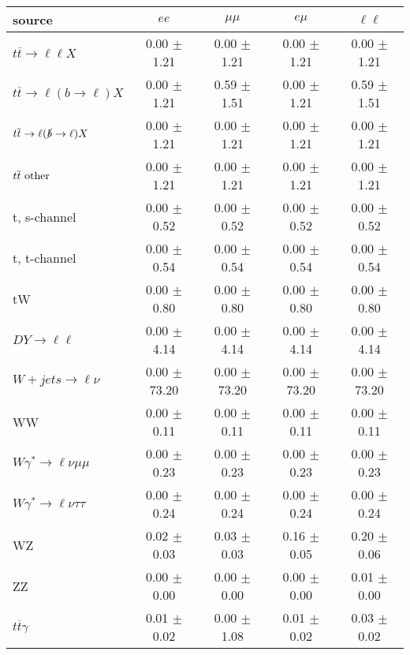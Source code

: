 \begin{tabular}{l|cccc} \hline\hline
source & $ee$ & $\mu\mu$ & $e\mu$ & $\ell\ell $ \\
\hline
$t\overline{t} \rightarrow \ell \ell X$ &  0.00 $\pm$  1.21 &  0.00 $\pm$  1.21 &  0.00 $\pm$  1.21 &  0.00 $\pm$  1.21 \\
$t\overline{t} \rightarrow \ell (b \rightarrow \ell) X$ &  0.00 $\pm$  1.21 &  0.59 $\pm$  1.51 &  0.00 $\pm$  1.21 &  0.59 $\pm$  1.51 \\
$t\overline{t} \rightarrow \ell (\slashed b \rightarrow \ell) X$ &  0.00 $\pm$  1.21 &  0.00 $\pm$  1.21 &  0.00 $\pm$  1.21 &  0.00 $\pm$  1.21 \\
        $t\overline{t}\ \rm{other}$ &  0.00 $\pm$  1.21 &  0.00 $\pm$  1.21 &  0.00 $\pm$  1.21 &  0.00 $\pm$  1.21 \\
\hline
                       t, s-channel &  0.00 $\pm$  0.52 &  0.00 $\pm$  0.52 &  0.00 $\pm$  0.52 &  0.00 $\pm$  0.52 \\
                       t, t-channel &  0.00 $\pm$  0.54 &  0.00 $\pm$  0.54 &  0.00 $\pm$  0.54 &  0.00 $\pm$  0.54 \\
                                 tW &  0.00 $\pm$  0.80 &  0.00 $\pm$  0.80 &  0.00 $\pm$  0.80 &  0.00 $\pm$  0.80 \\
\hline
         $DY \rightarrow \ell \ell$ &  0.00 $\pm$  4.14 &  0.00 $\pm$  4.14 &  0.00 $\pm$  4.14 &  0.00 $\pm$  4.14 \\
      $W+jets \rightarrow \ell \nu$ &  0.00 $\pm$ 73.20 &  0.00 $\pm$ 73.20 &  0.00 $\pm$ 73.20 &  0.00 $\pm$ 73.20 \\
                                 WW &  0.00 $\pm$  0.11 &  0.00 $\pm$  0.11 &  0.00 $\pm$  0.11 &  0.00 $\pm$  0.11 \\
\hline
$W\gamma^{*} \rightarrow \ell \nu \mu\mu$ &  0.00 $\pm$  0.23 &  0.00 $\pm$  0.23 &  0.00 $\pm$  0.23 &  0.00 $\pm$  0.23 \\
$W\gamma^{*} \rightarrow \ell \nu \tau\tau$ &  0.00 $\pm$  0.24 &  0.00 $\pm$  0.24 &  0.00 $\pm$  0.24 &  0.00 $\pm$  0.24 \\
                                 WZ &  0.02 $\pm$  0.03 &  0.03 $\pm$  0.03 &  0.16 $\pm$  0.05 &  0.20 $\pm$  0.06 \\
                                 ZZ &  0.00 $\pm$  0.00 &  0.00 $\pm$  0.00 &  0.00 $\pm$  0.00 &  0.01 $\pm$  0.00 \\
\hline
              $t\overline{t}\gamma$ &  0.01 $\pm$  0.02 &  0.00 $\pm$  1.08 &  0.01 $\pm$  0.02 &  0.03 $\pm$  0.02 \\

\end{tabular}
